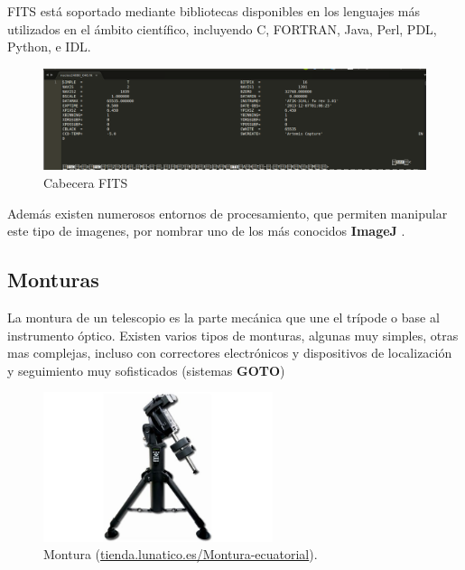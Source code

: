 \bigskip
FITS está soportado mediante bibliotecas disponibles en los lenguajes más utilizados en el ámbito científico, incluyendo C, FORTRAN, Java, Perl, PDL, Python, e IDL. 

\begin{figure}[h]
	\centering
	\includegraphics[width=1.0\linewidth]{../images/fit}
	\caption[Cabecera FITS]{Cabecera FITS}
	\label{fig:fit}
\end{figure}

\bigskip
Además existen numerosos entornos de procesamiento, que permiten manipular este tipo de imagenes, por nombrar uno de los más conocidos \textbf{ImageJ} \cite{Imagej}.


\subsection{Monturas}

La montura de un telescopio es la parte mecánica que une el trípode o base al instrumento óptico. Existen varios tipos de monturas, algunas muy simples, otras mas complejas, incluso con correctores electrónicos y dispositivos de localización y seguimiento muy sofisticados (sistemas \textbf{GOTO})

\bigskip
\begin{figure}[!ht]
	\begin{center}
		\includegraphics[width=0.6\textwidth]{../images/montura.jpg}
		\caption[Montura]{Montura (\href{http://tienda.lunatico.es/Montura-ecuatorial-SkyWatcher-EQ-8-con-tripod}{tienda.lunatico.es/Montura-ecuatorial}).}
		\label{fig:montura}
	\end{center}
\end{figure}

